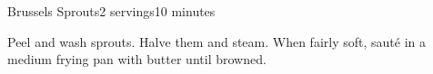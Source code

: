 \documentclass[../Cookbook.tex]{subfiles}
\begin{document}
\begin{recipe}{Brussels Sprouts}{2 servings}{10 minutes}

Peel and wash sprouts. Halve them and steam. When fairly soft, saut\'e in a medium frying pan with butter until browned.

\end{recipe}
\end{document}
